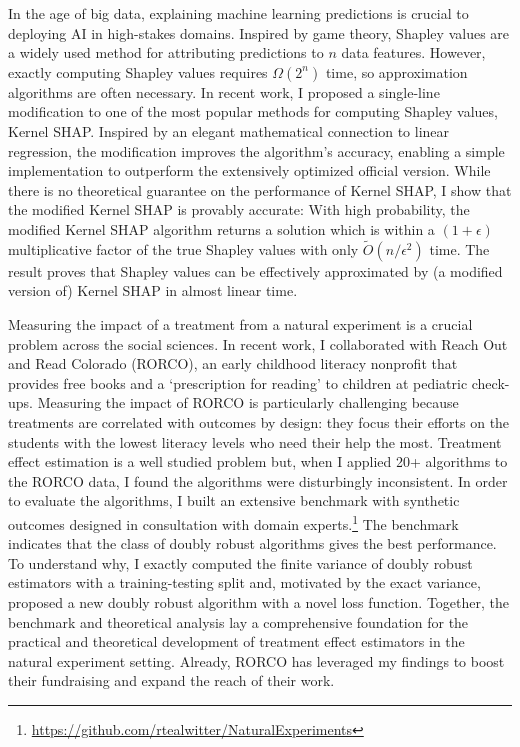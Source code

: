 \documentclass[11pt]{article}
\begin{document}
In the age of big data, explaining machine learning predictions is crucial to deploying AI in high-stakes domains. Inspired by game theory, Shapley values are a widely used method for attributing predictions to $n$ data features. However, exactly computing Shapley values requires $\Omega(2^n)$ time, so approximation algorithms are often necessary. In recent work, I proposed a single-line modification to one of the most popular methods for computing Shapley values, Kernel SHAP. Inspired by an elegant mathematical connection to linear regression, the modification improves the algorithm's accuracy, enabling a simple implementation to outperform the extensively optimized official version. While there is no theoretical guarantee on the performance of Kernel SHAP, I show that the modified Kernel SHAP is provably accurate: With high probability, the modified Kernel SHAP algorithm returns a solution which is within a $(1+\epsilon)$ multiplicative factor of the true Shapley values with only $\tilde{O}(n/\epsilon^2)$ time. The result proves that Shapley values can be effectively approximated by (a modified version of) Kernel SHAP in almost linear time.

Measuring the impact of a treatment from a natural experiment is a crucial problem across the social sciences. In recent work, I collaborated with Reach Out and Read Colorado (RORCO), an early childhood literacy nonprofit that provides free books and a `prescription for reading' to children at pediatric check-ups. Measuring the impact of RORCO is particularly challenging because treatments are correlated with outcomes by design: they focus their efforts on the students with the lowest literacy levels who need their help the most. Treatment effect estimation is a well studied problem but, when I applied 20+ algorithms to the RORCO data, I found the algorithms were disturbingly inconsistent. In order to evaluate the algorithms, I built an extensive benchmark with synthetic outcomes designed in consultation with domain experts.\footnote{\url{https://github.com/rtealwitter/NaturalExperiments}} The benchmark indicates that the class of doubly robust algorithms gives the best performance. To understand why, I exactly computed the finite variance of doubly robust estimators with a training-testing split and, motivated by the exact variance, proposed a new doubly robust algorithm with a novel loss function. Together, the benchmark and theoretical analysis lay a comprehensive foundation for the practical and theoretical development of treatment effect estimators in the natural experiment setting. Already, RORCO has leveraged my findings to boost their fundraising and expand the reach of their work.
\end{document}
